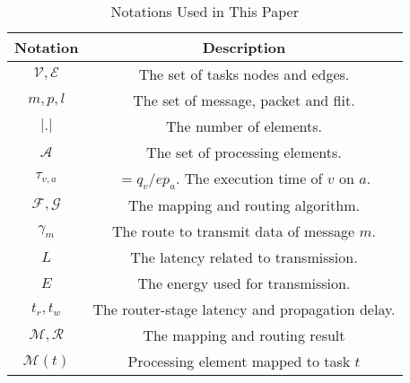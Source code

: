
\setsinglespace
\begin{nabstract}

\newpage
\end{nabstract}

\setonehalfspace
{}
\tableofcontents
\listoffigures
\listoftables
\begin{table}
    \caption{Notations Used in This Paper}
    \renewcommand{\arraystretch}{1.0}
    \arrayrulewidth=0.85pt
    \tabcolsep 3pt
    \centering
    \footnotesize
    \begin{tabular}[c]{c  c}
        \hline
        \hline
        {\bf Notation }&\bf{Description}\\
        \hline
        $\mathcal{V}, \mathcal{E}$ &  The set of tasks nodes and edges. \\
        $m,p,l$ & The set of message, packet and flit. \\
        $|.|$ & The number of elements.\\
        $\mathcal{A}$& The set of processing elements. \\
        $\tau_{v,a}$& $=q_v/ep_a$. The execution time of $v$ on $a$. \\
        $\mathcal{F},\mathcal{G}$& The mapping and routing algorithm. \\
        $\gamma_m$& The route to transmit data of message $m$. \\
        ${L}$ & The latency related to transmission. \\
        $E$ & The energy used for transmission.\\
        $t_r, t_w$ & The router-stage latency and propagation delay.\\
        $\mathcal{M},\mathcal{R}$& The mapping and routing result \\
        $\mathcal{M}(t)$& Processing element mapped to task $t$ \\
        \hline
        
    \hline
    \end{tabular}
    \label{notations}

\end{table}

\newpage
\startarabicpagination
